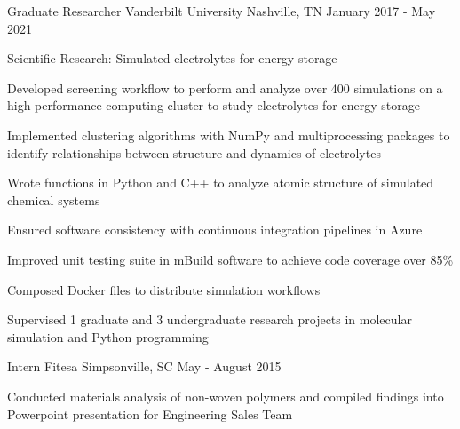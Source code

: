 
\begin{cventries}
  \cventry
    {Graduate Researcher} %
    {Vanderbilt University} %
    {Nashville, TN} %
    {January 2017 - May 2021} %
    {
     Scientific Research: Simulated electrolytes for energy-storage

      \begin{cvitems} %
        \item{Developed screening workflow to perform and analyze over 400
            simulations on a high-performance computing cluster to study
              electrolytes for energy-storage}
        \item{Implemented clustering algorithms with NumPy and multiprocessing
            packages to identify relationships between structure and dynamics of
              electrolytes}
        \item{Wrote functions in Python and C++ to analyze atomic structure of
            simulated chemical systems}
      \end{cvitems}
    }
    {
      \begin{cvitems} %
        \item{Ensured software consistency with continuous integration
            pipelines in Azure}
        \item{Improved unit testing suite in mBuild software to achieve code coverage over
            85\%}
        \item{Composed Docker files to distribute simulation workflows}
        \item {Supervised 1 graduate and 3 undergraduate research 
            projects in molecular simulation and Python programming}
      \end{cvitems}
    }


  \cventry
    {Intern} %
    {Fitesa} %
    {Simpsonville, SC} %
    {May - August 2015} %
    {
      \begin{cvitems} %
        \item{Conducted materials analysis of non-woven polymers and compiled
            findings into Powerpoint presentation for Engineering Sales Team}
      \end{cvitems}
    }
\end{cventries}

